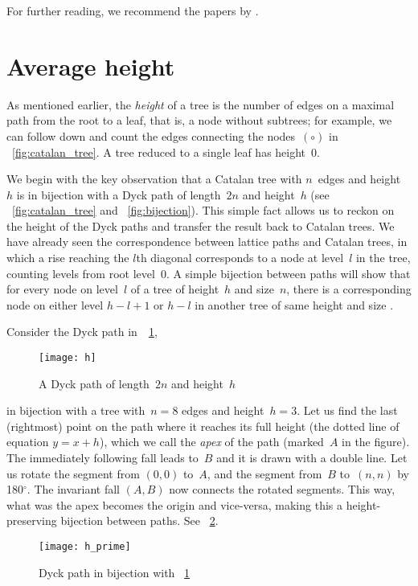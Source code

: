 For further reading, we recommend the papers by
\citet*{DershwowitzZaks_1980,DershowitzZaks_1981,DershowitzZaks_1990}.

\section{Average height}
\label{sec:Catalan_height}

As mentioned earlier, the \emph{height} of a tree is the number of
edges on a maximal path from the root to a leaf, that is, a node
without subtrees; for example, we can follow down and count the edges
connecting the nodes~\((\circ)\) in \fig~\ref{fig:catalan_tree}. A
tree reduced to a single leaf has height~\(0\).

We begin with the key observation that a Catalan tree with \(n\)~edges
and height~\(h\) is in bijection with a Dyck path of length~\(2n\) and
height~\(h\) (see \fig~\vref{fig:catalan_tree} and
\fig~\ref{fig:bijection}). This simple fact allows us to reckon on the
height of the Dyck paths and transfer the result back to Catalan
trees. We have already seen the correspondence between lattice paths
and Catalan trees, in which a rise reaching the $l$th diagonal
corresponds to a node at level~$l$ in the tree, counting levels from
root level~$0$. A simple bijection between paths will show that for
every node on level~$l$ of a tree of height~$h$ and size~$n$, there is
a corresponding node on either level $h-l+1$ or $h-l$ in another tree
of same height and size \citep{Rinderknecht_2013d}.

Consider the Dyck path in~\Fig~\ref{fig:h},
\begin{figure}
\centering
\texttt{[image: h]}
\caption{A Dyck path of length~\(2n\) and height~\(h\)}
\label{fig:h}
\end{figure}
in bijection with a tree with~\(n=8\) edges and height~\(h=3\). Let us
find the last (rightmost) point on the path where it reaches its full
height (the dotted line of equation \(y = x + h\)), which we call the
\emph{apex} of the path (marked~$A$ in the figure). The immediately
following fall leads to~$B$ and it is drawn with a double line. Let us
rotate the segment from $(0,0)$ to~$A$, and the segment from~$B$
to~$(n,n)$ by 180$^\circ$. The invariant fall $(A,B)$ now connects the
rotated segments. This way, what was the apex becomes the origin and
vice\hyp{}versa, making this a height\hyp{}preserving bijection
between paths. See \fig~\ref{fig:h_prime}.
\begin{figure}
\centering
\texttt{[image: h\_prime]}
\caption{Dyck path in bijection with \fig~\ref{fig:h}}
\label{fig:h_prime}
\end{figure}

